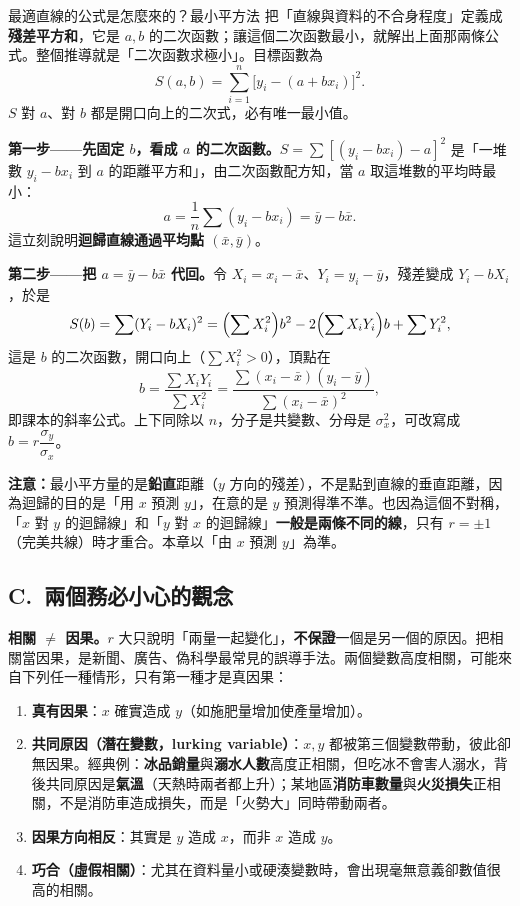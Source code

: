 \documentclass[11pt]{article}
\begin{document}
\begin{補充框}{最適直線的公式是怎麼來的？最小平方法}
把「直線與資料的不合身程度」定義成\textbf{殘差平方和}，它是 $a,b$ 的二次函數；讓這個二次函數最小，就解出上面那兩條公式。整個推導就是「二次函數求極小」。目標函數為
$$S(a,b)=\sum_{i=1}^{n}\bigl[y_i-(a+bx_i)\bigr]^2.$$
$S$ 對 $a$、對 $b$ 都是開口向上的二次式，必有唯一最小值。

\textbf{第一步——先固定 $b$，看成 $a$ 的二次函數。}$S=\sum[(y_i-bx_i)-a]^2$ 是「一堆數 $y_i-bx_i$ 到 $a$ 的距離平方和」，由二次函數配方知，當 $a$ 取這堆數的平均時最小：
$$a=\frac1n\sum(y_i-bx_i)=\bar y - b\bar x.$$
這立刻說明\textbf{迴歸直線通過平均點 $(\bar x,\bar y)$}。

\textbf{第二步——把 $a=\bar y-b\bar x$ 代回。}令 $X_i=x_i-\bar x$、$Y_i=y_i-\bar y$，殘差變成 $Y_i-bX_i$，於是
$$S(b)=\sum (Y_i-bX_i)^2=\Bigl(\sum X_i^2\Bigr)b^2-2\Bigl(\sum X_iY_i\Bigr)b+\sum Y_i^2,$$
這是 $b$ 的二次函數，開口向上（$\sum X_i^2>0$），頂點在
$$b=\frac{\sum X_iY_i}{\sum X_i^2}=\frac{\sum(x_i-\bar x)(y_i-\bar y)}{\sum(x_i-\bar x)^2},$$
即課本的斜率公式。上下同除以 $n$，分子是共變數、分母是 $\sigma_x^2$，可改寫成 $b=r\dfrac{\sigma_y}{\sigma_x}$。

\textbf{注意：}最小平方量的是\textbf{鉛直}距離（$y$ 方向的殘差），不是點到直線的垂直距離，因為迴歸的目的是「用 $x$ 預測 $y$」，在意的是 $y$ 預測得準不準。也因為這個不對稱，「$x$ 對 $y$ 的迴歸線」和「$y$ 對 $x$ 的迴歸線」\textbf{一般是兩條不同的線}，只有 $r=\pm1$（完美共線）時才重合。本章以「由 $x$ 預測 $y$」為準。
\end{補充框}

\subsection*{\sffamily C.\ 兩個務必小心的觀念}

\textbf{相關 $\ne$ 因果。}$r$ 大只說明「兩量一起變化」，\textbf{不保證}一個是另一個的原因。把相關當因果，是新聞、廣告、偽科學最常見的誤導手法。兩個變數高度相關，可能來自下列任一種情形，只有第一種才是真因果：

\begin{enumerate}\setlength{\itemsep}{2pt}
\item \textbf{真有因果}：$x$ 確實造成 $y$（如施肥量增加使產量增加）。
\item \textbf{共同原因（潛在變數，lurking variable）}：$x,y$ 都被第三個變數帶動，彼此卻無因果。經典例：\textbf{冰品銷量}與\textbf{溺水人數}高度正相關，但吃冰不會害人溺水，背後共同原因是\textbf{氣溫}（天熱時兩者都上升）；某地區\textbf{消防車數量}與\textbf{火災損失}正相關，不是消防車造成損失，而是「火勢大」同時帶動兩者。
\item \textbf{因果方向相反}：其實是 $y$ 造成 $x$，而非 $x$ 造成 $y$。
\item \textbf{巧合（虛假相關）}：尤其在資料量小或硬湊變數時，會出現毫無意義卻數值很高的相關。
\end{enumerate}
\end{document}

